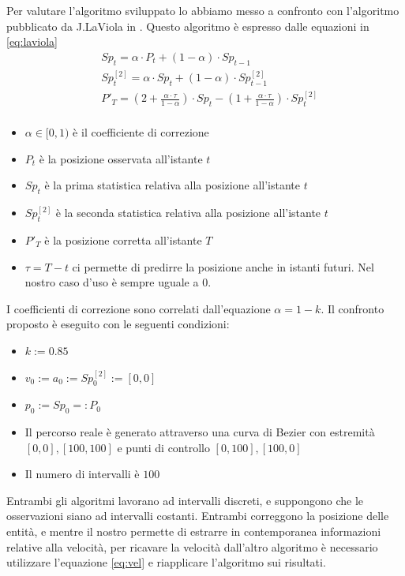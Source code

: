 Per valutare l'algoritmo sviluppato lo abbiamo messo a confronto con l'algoritmo pubblicato da J.LaViola in \cite{laviola}.
Questo algoritmo è espresso dalle equazioni in \ref{eq:laviola}
\begin{equation}
    \label{eq:laviola}
    \begin{split}
        & Sp_t = \alpha \cdot P_t + (1-\alpha) \cdot Sp_{t-1} \\
        & Sp^{[2]}_t = \alpha \cdot Sp_{t} + (1-\alpha) \cdot Sp^{[2]}_{t-1} \\
        & P'_T = \left(2 + \frac{\alpha \cdot \tau}{1 - \alpha}\right) \cdot Sp_t - \left(1 + \frac{\alpha \cdot \tau}{1 - \alpha}\right) \cdot Sp^{[2]}_t \\
    \end{split}
\end{equation}
\begin{itemize}
    \item $\alpha \in [0, 1)$ è il coefficiente di correzione
    \item $P_t$ è la posizione osservata all'istante $t$
    \item $Sp_t$ è la prima statistica relativa alla posizione all'istante $t$
    \item $Sp^{[2]}_t$ è la seconda statistica relativa alla posizione all'istante $t$
    \item $P'_T$ è la posizione corretta all'istante $T$
    \item $\tau = T - t$ ci permette di predirre la posizione anche in istanti futuri. Nel nostro caso d'uso è sempre uguale a 0.
\end{itemize}
I coefficienti di correzione sono correlati dall'equazione $\alpha = 1-k$.
Il confronto proposto è eseguito con le seguenti condizioni:
\begin{itemize}
    \item $k := 0.85$
    \item $v_0 := a_0 := Sp^{[2]}_0 := [0, 0]$
    \item $p_0 := Sp_0 =: P_0$
    \item Il percorso reale è generato attraverso una curva di Bezier con estremità $[0, 0], [100, 100]$ e punti di controllo $[0, 100], [100, 0]$
    \item Il numero di intervalli è $100$
\end{itemize}
Entrambi gli algoritmi lavorano ad intervalli discreti, e suppongono che le osservazioni siano ad intervalli costanti.
Entrambi correggono la posizione delle entità, e mentre il nostro permette di estrarre in contemporanea informazioni relative alla velocità, per ricavare la velocità dall'altro algoritmo è necessario utilizzare l'equazione \ref{eq:vel} e riapplicare l'algoritmo sui risultati.

